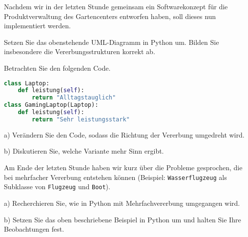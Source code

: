 \documentclass[11pt, a4paper, oneside]{article}
\begin{document}
	
	
	
	Nachdem wir in der letzten Stunde gemeinsam ein Softwarekonzept für die Produktverwaltung des Gartencenters entworfen haben, soll dieses nun implementiert werden.
	
	\begin{figure}[h]
		\centering
	\end{figure}

	Setzen Sie das obenstehende UML-Diagramm in Python um.
	Bilden Sie insbesondere die Vererbungsstrukturen korrekt ab.
	
	
	Betrachten Sie den folgenden Code.
	
	\begin{lstlisting}[language=python]
class Laptop:
	def leistung(self):
		return "Alltagstauglich"
class GamingLaptop(Laptop):
	def leistung(self):
		return "Sehr leistungsstark"
	\end{lstlisting}

	a) Verändern Sie den Code, sodass die Richtung der Vererbung umgedreht wird.
	
	b) Diskutieren Sie, welche Variante mehr Sinn ergibt.
	
	\pagebreak
	
	
	Am Ende der letzten Stunde haben wir kurz über die Probleme gesprochen, die bei mehrfacher Vererbung entstehen können (Beispiel: \texttt{Wasserflugzeug} als Subklasse von \texttt{Flugzeug} und \texttt{Boot}).
	
	a) Recherchieren Sie, wie in Python mit Mehrfachvererbung umgegangen wird.
		
	\lines[3cm]
		
	b) Setzen Sie das oben beschriebene Beispiel in Python um und halten Sie Ihre Beobachtungen fest.
		
	\lines[3cm]
	
\end{document}
